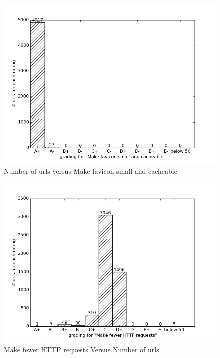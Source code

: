 \documentclass[conference]{IEEEtran}
\begin{document}
\begin{figure}[ht]
 \centering
  \includegraphics[scale=0.33]{new-img-jpg/vlab-jpg/Make favicon small and cacheable.jpg}
\caption{Number of urls versus Make favicon small and cacheable}	
\label{fig:favicon}
\end{figure}

\begin{figure}[ht]
 \centering
  \includegraphics[scale=0.33]{new-img-jpg/vlab-jpg/Make fewer HTTP requests.jpg}
\caption{Make fewer HTTP requests Versus Number of urls}	
\label{fig:httpr}
\end{figure}

\end{document}
